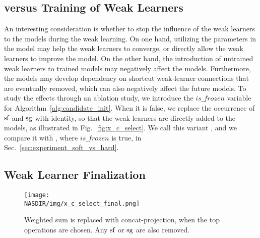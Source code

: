 \subsection{\petridishhard versus \petridishsoft Training of Weak Learners}
\label{sec:soft_vs_hard}
An interesting consideration is whether to stop the influence of the weak learners to the models during the weak learning. 
On one hand, utilizing the parameters in the model may help the weak learners to converge, or directly allow the weak learners to improve the model. 
On the other hand, the introduction of 
untrained weak learners to trained models may negatively affect the models. Furthermore, the models may develop dependency on shortcut weak-learner connections 
that are eventually removed, which can also negatively affect the future models. 
To study the effects through an ablation study, we introduce the $is\_frozen$ variable for Algorithm~\ref{alg:candidate_init}. 
When it is false, we replace the occurrence of $\textrm{sf}$ and $\textrm{sg}$ with identity, so that the weak learners are directly added to the models, 
as illustrated in Fig.~\ref{fig:x_c_select}. We call this variant
\petridishsoft, and we compare it with \petridishhard, where $is\_frozen$ is true, in Sec.~\ref{sec:experiment_soft_vs_hard}. 





\subsection{Weak Learner Finalization}
\label{sec:candidate_finalize}

\begin{figure}[t]
\centering
    \texttt{[image: \\NASDIR/img/x\_c\_select\_final.png]}
    \caption{Weighted sum is replaced with concat-projection, when the top operations are chosen. Any $\textrm{sf}$ or $\textrm{sg}$ are also removed.}
    \label{fig:x_c_select_final}
\end{figure}

